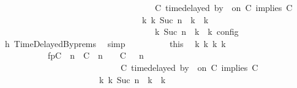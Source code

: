 \begin{isabellebody}
\ \ \ \ \ \ \ \ \ \ \ \ \ \ \ \ \ \ \ \ \ \ \ \ \ \ \ \ \ \ \ \ \ {\isasymturnstile}\ {\isasymPsi}\ {\isasymtriangleright}\ {\isacharparenleft}{\isacharparenleft}C\ time{\isacharminus}delayed\ by\ {\isasymdelta}{\isasymtau}\ on\ C\ implies\ C\ {\isacharhash}\ {\isasymPhi}{\isacharparenright}{\isacharparenright}\isanewline
\ \ \ \ \ \ \ \ \ \ \ \ \ \ \ \ \ \ \ \ \ \ \ \ \ \ \ \ \ \ \ \ \ {\isasymhookrightarrow}\isactrlbsup k\isactrlesup \ {\isacharparenleft}{\isasymGamma}\isactrlsub k{\isacharcomma}\ Suc\ n\ {\isasymturnstile}\ {\isasymPsi}\isactrlsub k\ {\isasymtriangleright}\ {\isasymPhi}\isactrlsub k{\isacharparenright}{\isacharparenright}\isanewline
\ \ \ \ \ \ \ \ \ \ \ \ \ \ \ \ \ \ \ \ \ \ \ \ \ \ \ \ \ \ \ \ {\isasymand}\ {\isasymrho}\ {\isasymin}\ {\isasymlbrakk}\ {\isasymGamma}\isactrlsub k{\isacharcomma}\ Suc\ n\ {\isasymturnstile}\ {\isasymPsi}\isactrlsub k\ {\isasymtriangleright}\ {\isasymPhi}\isactrlsub k\ {\isasymrbrakk}\isactrlsub c\isactrlsub o\isactrlsub n\isactrlsub f\isactrlsub i\isactrlsub g{\isacartoucheclose}\isanewline
\ \ \ \ \ \ \ \ \ \ \isamarkupfalse%
\ h{}\ TimeDelayedBy{\isachardot}prems\ \isamarkupfalse%
\ simp\isanewline
\ \ \ \ \ \ \ \ \isamarkupfalse%
\ this\ \isamarkupfalse%
\ {\isasymGamma}\isactrlsub k\ {\isasymPsi}\isactrlsub k\ {\isasymPhi}\isactrlsub k\ k\isanewline
\ \ \ \ \ \ \ \ \ \ \ fp{\isacharcolon}{\isacartoucheopen}{\isacharparenleft}{\isacharparenleft}{\isacharparenleft}C\ {\isasymUp}\ n{\isacharparenright}\ {\isacharhash}\ {\isacharparenleft}C\ {\isacharat}\ n\ {\isasymoplus}\ {\isasymdelta}{\isasymtau}\ {\isasymRightarrow}\ C\ {\isacharhash}\ {\isasymGamma}{\isacharparenright}{\isacharcomma}\ n\isanewline
\ \ \ \ \ \ \ \ \ \ \ \ \ \ \ \ \ \ \ \ \ \ \ \ \ {\isasymturnstile}\ {\isasymPsi}\ {\isasymtriangleright}\ {\isacharparenleft}{\isacharparenleft}C\ time{\isacharminus}delayed\ by\ {\isasymdelta}{\isasymtau}\ on\ C\ implies\ C\ {\isacharhash}\ {\isasymPhi}{\isacharparenright}{\isacharparenright}\isanewline
\ \ \ \ \ \ \ \ \ \ \ \ \ \ \ \ \ \ \ \ \ \ \ {\isasymhookrightarrow}\isactrlbsup k\isactrlesup \ {\isacharparenleft}{\isasymGamma}\isactrlsub k{\isacharcomma}\ Suc\ n\ {\isasymturnstile}\ {\isasymPsi}\isactrlsub k\ {\isasymtriangleright}\ {\isasymPhi}\isactrlsub k{\isacharparenright}{\isacartoucheclose}\isanewline

\end{isabellebody}
